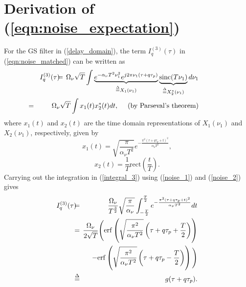 \section{Derivation of (\ref{eqn:noise_expectation})}
\label{appxC}
For the GS filter in (\ref{delay_domain}),
the term $I_q^{(3)}(\tau)$ in (\ref{eqn:noise_matched}) can be written as
\begin{eqnarray}
\hspace{-8mm}
I_q^{(3)}(\tau) & \hspace{-2mm} = & \hspace{-2mm} \Omega_{\nu}\sqrt{T}\int \underbrace{e^{-\alpha_{\nu}T^{2}\nu_1^{2}}e^{j2\pi\nu_1(\tau+q\tau_p)}}_{\overset{\Delta}{=}X_1(\nu_1)}\underbrace{\mathrm{sinc}(T\nu_1)}_{\overset{\Delta}{=}X_2^{*}(\nu_1)}d\nu_1 \nonumber \\
& \hspace{-17mm} = & \hspace{-10mm} \Omega_{\nu}\sqrt{T}\int x_1(t)x_2^{*}(t)dt, \quad \text{ (by Parseval's theorem)}
\label{integral_3}
\end{eqnarray} 
where $x_1(t)$ and $x_2(t)$ are the time domain representations of $X_1(\nu_1)$ and $X_2(\nu_1)$, respectively, given by
\begin{equation}
x_1(t)=\sqrt{\frac{\pi}{\alpha_{\nu}T^{2}}}e^{-\frac{\pi^{2}(\tau+q\tau_p+t)^{2}}{\alpha_{\nu}T^{2}}},
\label{noise_1}
\end{equation}
\begin{equation}
x_2(t)=\frac{1}{T}\mathrm{rect}\left(\frac{t}{T}\right). 
\label{noise_2}
\end{equation}
Carrying out the integration in (\ref{integral_3}) using (\ref{noise_1}) and (\ref{noise_2}) gives
\begin{eqnarray}
I_{q}^{(3)}(\tau) & \hspace{-2mm} = & \hspace{-2mm} \frac{\Omega_{\nu}}{T^{\frac{3}{2}}}\sqrt{\frac{\pi}{\alpha_{\nu}}}\int_{-\frac{T}{2}}^{\frac{T}{2}}e^{-\frac{\pi^{2}(\tau+q\tau_p+t)^{2}}{\alpha_{\nu}T^{2}}}dt \nonumber \\
& \hspace{-2mm} = & \hspace{-2mm} \frac{\Omega_{\nu}}{2\sqrt{T}}\Bigg(\mathrm{erf}\left(\sqrt{\frac{\pi^{2}}{\alpha_{\nu}T^{2}}}\left(\tau+q\tau_p+\frac{T}{2}\right)\right) \nonumber \\
& \hspace{-2mm} & \hspace{-2mm} -\mathrm{erf}\left(\sqrt{\frac{\pi^{2}}{\alpha_{\nu}T^{2}}}\left(\tau+q\tau_p-\frac{T}{2}\right)\right)\Bigg) \nonumber \\
& \hspace{-2mm} \overset{\Delta}{=} & \hspace{-2mm} g(\tau+q\tau_p).
\end{eqnarray}
